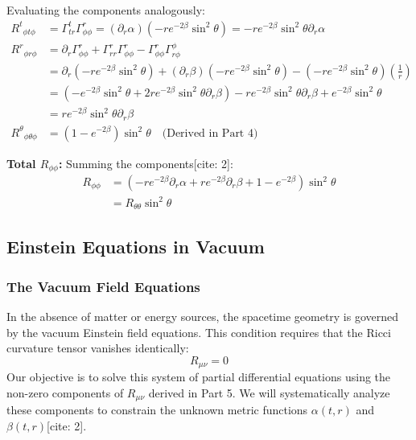 \documentclass[11pt, a4paper]{report}
\begin{document}
Evaluating the components analogously:
\begin{align}
    {R^t}_{\phi t\phi} &= \Gamma^t_{tr}\Gamma^r_{\phi\phi} = (\partial_r \alpha) \left( -r e^{-2\beta} \sin^2\theta \right) = -r e^{-2\beta} \sin^2\theta \partial_r \alpha \\
    {R^r}_{\phi r\phi} &= \partial_r \Gamma^r_{\phi\phi} + \Gamma^r_{rr}\Gamma^r_{\phi\phi} - \Gamma^r_{\phi\phi}\Gamma^\phi_{r\phi} \nonumber \\
    &= \partial_r \left( -r e^{-2\beta} \sin^2\theta \right) + (\partial_r \beta) \left( -r e^{-2\beta} \sin^2\theta \right) - \left( -r e^{-2\beta} \sin^2\theta \right) \left(\frac{1}{r}\right) \nonumber \\
    &= \left( -e^{-2\beta} \sin^2\theta + 2r e^{-2\beta} \sin^2\theta \partial_r \beta \right) - r e^{-2\beta} \sin^2\theta \partial_r \beta + e^{-2\beta} \sin^2\theta \nonumber \\
    &= r e^{-2\beta} \sin^2\theta \partial_r \beta \\
    {R^\theta}_{\phi\theta\phi} &= (1 - e^{-2\beta}) \sin^2\theta \quad \text{(Derived in Part 4)}
\end{align}

\textbf{Total $R_{\phi\phi}$:}
Summing the components[cite: 2]:
\begin{align}
    R_{\phi\phi} &= \left( -r e^{-2\beta} \partial_r \alpha + r e^{-2\beta} \partial_r \beta + 1 - e^{-2\beta} \right) \sin^2\theta \nonumber \\
    &= R_{\theta\theta} \sin^2\theta
\end{align}


\subsection{Einstein Equations in Vacuum}

\subsubsection*{The Vacuum Field Equations}

In the absence of matter or energy sources, the spacetime geometry is governed by the vacuum Einstein field equations. This condition requires that the Ricci curvature tensor vanishes identically:
\begin{equation}
    R_{\mu\nu} = 0 \label{eq:vacuum_einstein}
\end{equation}
Our objective is to solve this system of partial differential equations using the non-zero components of $R_{\mu\nu}$ derived in Part 5. We will systematically analyze these components to constrain the unknown metric functions $\alpha(t,r)$ and $\beta(t,r)$[cite: 2].
\end{document}
